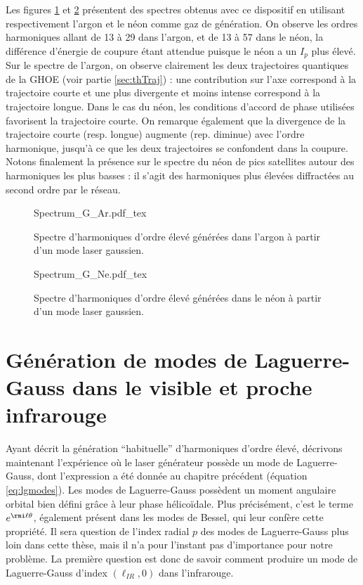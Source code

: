 Les figures \ref{Fig:SpectrumGAr} et \ref{Fig:SpectrumGNe} présentent des spectres obtenus avec ce dispositif en utilisant respectivement l'argon et le néon comme gaz de génération. On observe les ordres harmoniques allant de 13 à 29 dans l'argon, et de 13 à 57 dans le néon, la différence d'énergie de coupure étant attendue puisque le néon a un $I_p$ plus élevé. Sur le spectre de l'argon, on observe clairement les deux trajectoires quantiques de la GHOE (voir partie \ref{sec:thTraj}) : une contribution sur l'axe correspond à la trajectoire courte et une plus divergente et moins intense correspond à la trajectoire longue. Dans le cas du néon, les conditions d'accord de phase utilisées favorisent la trajectoire courte. On remarque également que la divergence de la trajectoire courte (resp. longue) augmente (rep. diminue) avec l'ordre harmonique, jusqu'à ce que les deux trajectoires se confondent dans la coupure. Notons finalement la présence sur le spectre du néon de pics satellites autour des harmoniques les plus basses : il s'agit des harmoniques plus élevées diffractées au second ordre par le réseau.
\begin{figure}[!ht]
\centering
\def\svgwidth{\columnwidth}
{Spectrum_G_Ar.pdf_tex}
\caption{Spectre d'harmoniques d'ordre élevé générées dans l'argon à partir d'un mode laser gaussien.}
\label{Fig:SpectrumGAr}
\end{figure}
\begin{figure}[!ht]
\centering
\def\svgwidth{\columnwidth}
{Spectrum_G_Ne.pdf_tex}
\caption{Spectre d'harmoniques d'ordre élevé générées dans le néon à partir d'un mode laser gaussien.}
\label{Fig:SpectrumGNe}
\end{figure}

\section{Génération de modes de Laguerre-Gauss dans le visible et proche infrarouge}
Ayant décrit la génération ``habituelle'' d'harmoniques d'ordre élevé, décrivons maintenant l'expérience où le laser générateur possède un mode de Laguerre-Gauss, dont l'expression a été donnée au chapitre précédent (équation \ref{eq:lgmodes}). Les modes de Laguerre-Gauss possèdent un moment angulaire orbital bien défini grâce à leur phase hélicoïdale. Plus précisément, c'est le terme $e^{\rmi\ell\theta}$, également présent dans les modes de Bessel, qui leur confère cette propriété. Il sera question de l'index radial $p$ des modes de Laguerre-Gauss plus loin dans cette thèse, mais il n'a pour l'instant pas d'importance pour notre problème. La première question est donc de savoir comment produire un mode de Laguerre-Gauss d'index $(\ell_{IR},0)$ dans l'infrarouge. 

